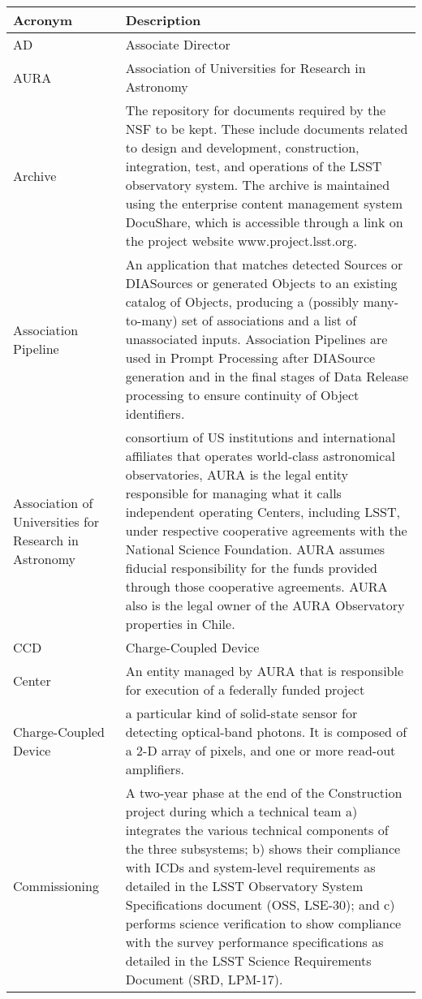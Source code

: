 \addtocounter{table}{-1}
\begin{longtable}{|l|p{}|}\hline
\textbf{Acronym} & \textbf{Description}  \\\hline

AD & Associate \gls{Director} \\\hline
AURA & \gls{Association of Universities for Research in Astronomy} \\\hline
Archive & The repository for documents required by the \gls{NSF} to be kept. These include documents related to design and development, construction, integration, test, and operations of the \gls{LSST} observatory system. The archive is maintained using the enterprise content management system \gls{DocuShare}, which is accessible through a link on the project website www.project.lsst.org. \\\hline
Association Pipeline & An application that matches detected Sources or DIASources or generated Objects to an existing catalog of Objects, producing a (possibly many-to-many) set of associations and a list of unassociated inputs. Association Pipelines are used in \gls{Prompt Processing} after \gls{DIASource} generation and in the final stages of \gls{Data Release} processing to ensure continuity of \gls{Object} identifiers. \\\hline
Association of Universities for Research in Astronomy &  consortium of \gls{US} institutions and international affiliates that operates world-class astronomical observatories, \gls{AURA} is the legal entity responsible for managing what it calls independent operating Centers, including \gls{LSST}, under respective cooperative agreements with the \gls{National Science Foundation}. \gls{AURA} assumes fiducial responsibility for the funds provided through those cooperative agreements. \gls{AURA} also is the legal owner of the \gls{AURA} Observatory properties in Chile. \\\hline
CCD & \gls{Charge-Coupled Device} \\\hline
Center & An entity managed by \gls{AURA} that is responsible for execution of a federally funded project \\\hline
Charge-Coupled Device & a particular kind of solid-state sensor for detecting optical-band photons. It is composed of a 2-D array of pixels, and one or more read-out amplifiers. \\\hline
Commissioning & A two-year phase at the end of the \gls{Construction} project during which a technical team a) integrates the various technical components of the three subsystems; b) shows their compliance with ICDs and system-level requirements as detailed in the \gls{LSST} Observatory System Specifications document (\gls{OSS}, \gls{LSE}-30); and c) performs science verification to show compliance with the survey performance specifications as detailed in the \gls{LSST} Science Requirements \gls{Document} (\gls{SRD}, \gls{LPM}-17). \\\hline

\end{longtable}
